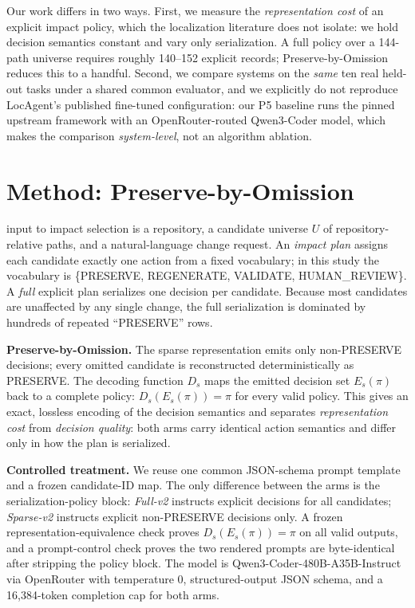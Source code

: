 Our work differs in two ways. First, we measure the \emph{representation
cost} of an explicit impact policy, which the localization literature does not
isolate: we hold decision semantics constant and vary only serialization. A
full policy over a 144-path universe requires roughly 140--152 explicit
records; Preserve-by-Omission reduces this to a handful. Second, we compare
systems on the \emph{same} ten real held-out tasks under a shared common
evaluator, and we explicitly do not reproduce LocAgent's published
fine-tuned configuration: our P5 baseline runs the pinned upstream framework
with an OpenRouter-routed Qwen3-Coder model, which makes the comparison
\emph{system-level}, not an algorithm ablation.

\section{Method: Preserve-by-Omission}
 input to impact selection is a repository, a candidate
universe $U$ of repository-relative paths, and a natural-language change
request. An \emph{impact plan} assigns each candidate exactly one action from a
fixed vocabulary; in this study the vocabulary is
\{PRESERVE, REGENERATE, VALIDATE, HUMAN\_REVIEW\}. A \emph{full} explicit plan
serializes one decision per candidate. Because most candidates are unaffected
by any single change, the full serialization is dominated by hundreds of
repeated ``PRESERVE'' rows.

\textbf{Preserve-by-Omission.} The sparse representation emits only
non-PRESERVE decisions; every omitted candidate is reconstructed
deterministically as PRESERVE. The decoding function $D_s$ maps the emitted
decision set $E_s(\pi)$ back to a complete policy: $D_s(E_s(\pi)) = \pi$ for
every valid policy. This gives an exact, lossless encoding of the decision
semantics and separates \emph{representation cost} from \emph{decision
quality}: both arms carry identical action semantics and differ only in how the
plan is serialized.

\textbf{Controlled treatment.} We reuse one common JSON-schema prompt template
and a frozen candidate-ID map. The only difference between the arms is the
serialization-policy block: \emph{Full-v2} instructs explicit decisions for all
candidates; \emph{Sparse-v2} instructs explicit non-PRESERVE decisions only. A
frozen representation-equivalence check proves $D_s(E_s(\pi)) = \pi$ on all
valid outputs, and a prompt-control check proves the two rendered prompts are
byte-identical after stripping the policy block. The model is
Qwen3-Coder-480B-A35B-Instruct \cite{qwen2025qwen3} via OpenRouter with
temperature 0, structured-output JSON schema, and a 16,384-token completion cap
for both arms.

